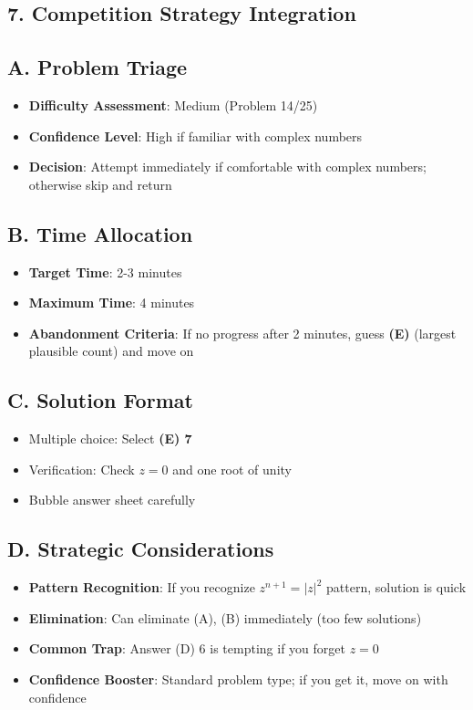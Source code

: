 \documentclass[11pt]{article}
\begin{document}
\begin{competitionbox}
\section*{7. Competition Strategy Integration}

\subsection*{A. Problem Triage}
\begin{itemize}[leftmargin=*]
    \item \textbf{Difficulty Assessment}: Medium (Problem 14/25)
    \item \textbf{Confidence Level}: High if familiar with complex numbers
    \item \textbf{Decision}: Attempt immediately if comfortable with complex numbers; otherwise skip and return
\end{itemize}

\subsection*{B. Time Allocation}
\begin{itemize}[leftmargin=*]
    \item \textbf{Target Time}: 2-3 minutes
    \item \textbf{Maximum Time}: 4 minutes
    \item \textbf{Abandonment Criteria}: If no progress after 2 minutes, guess \textbf{(E)} (largest plausible count) and move on
\end{itemize}

\subsection*{C. Solution Format}
\begin{itemize}[leftmargin=*]
    \item Multiple choice: Select \textbf{(E) 7}
    \item Verification: Check $z = 0$ and one root of unity
    \item Bubble answer sheet carefully
\end{itemize}

\subsection*{D. Strategic Considerations}
\begin{itemize}[leftmargin=*]
    \item \textbf{Pattern Recognition}: If you recognize $z^{n+1} = |z|^2$ pattern, solution is quick
    \item \textbf{Elimination}: Can eliminate (A), (B) immediately (too few solutions)
    \item \textbf{Common Trap}: Answer (D) 6 is tempting if you forget $z = 0$
    \item \textbf{Confidence Booster}: Standard problem type; if you get it, move on with confidence
\end{itemize}
\end{competitionbox}
\end{document}
